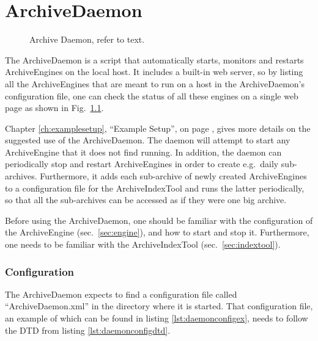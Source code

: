 \chapter{ArchiveDaemon} \label{ch:daemon}
\begin{figure}[htb]
\begin{center}
\end{center}
\caption{\label{fig:daemon}Archive Daemon, refer to text.}
\end{figure}

\noindent The ArchiveDaemon is a script that automatically starts,
monitors and restarts ArchiveEngines on the local host. It includes a
built-in web server, so by listing all the ArchiveEngines that are
meant to run on a host in the ArchiveDaemon's configuration file, one
can check the status of all these engines on a single web page as
shown in Fig.~\ref{fig:daemon}.

Chapter \ref{ch:examplesetup}, ``Example Setup'', on page
\pageref{ch:examplesetup}, gives more details on the suggested use of
the ArchiveDaemon. The daemon will attempt to start any ArchiveEngine
that it does not find running. In addition, the daemon can
periodically stop and restart ArchiveEngines in order to create
e.g.\ daily sub-archives.  Furthermore, it adds each sub-archive of
newly created ArchiveEngines to a configuration file for the
ArchiveIndexTool and runs the latter periodically, so that all the
sub-archives can be accessed as if they were one big archive.

Before using the ArchiveDaemon, one should be familiar
with the configuration of the ArchiveEngine (sec.\ \ref{sec:engine}),
and how to start and stop it. Furthermore, one needs to be familiar
with the ArchiveIndexTool (sec.\ \ref{sec:indextool}).

\subsection{Configuration}
The ArchiveDaemon expects to find a configuration file called
``ArchiveDaemon.xml'' in the directory where it is started.  That
configuration file, an example of which can be found in listing
\ref{lst:daemonconfigex}, needs to follow the DTD from listing
\ref{lst:daemonconfigdtd}.





